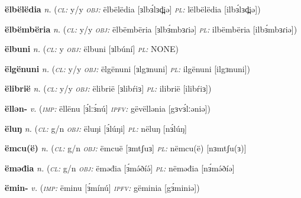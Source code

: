 \newentry
\headword\textbf{ëlbëlëdia}  
\synpos\textit{n.} 
\class(\textit{\textsc{cl:}} {y/y}
\object\textit{\textsc{obj:}} ëlbëlëdia [ɜlbɜ́lɜd̪iə]
\plural\textit{\textsc{pl:}} lëlbëlëdia [ilbɜ́lɜd̪iə])


\newentry
\headword\textbf{ëlbëmbëria}  
\synpos\textit{n.} 
\class(\textit{\textsc{cl:}} {y/y}
\object\textit{\textsc{obj:}} ëlbëmbëria [ɜlbɜ́mbɜɾiə]
\plural\textit{\textsc{pl:}} ilbëmbëria [ilbɜ́mbɜɾiə])

\newentry
\headword\textbf{ëlbuni}  
\ipa{[ɜlbúní]}
\synpos\textit{n.} 
\class(\textit{\textsc{cl:}} {y}
\object\textit{\textsc{obj:}} ëlbuni [ɜlbúní]
\plural\textit{\textsc{pl:}} NONE)

\newentry
\headword\textbf{ëlgënuni}  
\ipa{[ɜlgɜnuni]}
\synpos\textit{n.} 
\class(\textit{\textsc{cl:}} {y/y}
\object\textit{\textsc{obj:}} ëlgënuni [ɜlgɜnuni]
\plural\textit{\textsc{pl:}} ilgënuni [ilgɜnuni])

\newentry
\headword\textbf{ëlibrië}  
\ipa{[ɜlibŕiɜ]}
\synpos\textit{n.} 
\class(\textit{\textsc{cl:}} {y/y}
\object\textit{\textsc{obj:}} ëlibrië [ɜlibŕiɜ]
\plural\textit{\textsc{pl:}} ilibrië [ilibŕiɜ])


\newentry
\headword\textbf{ëllən-}  
\ipa{[ɜ́lːən-]}
\synpos\textit{v.} 
\imperative(\textit {\textsc{imp:}} ëllënu [ɜ́lːɜ́nú] 
\imperfective\textit{\textsc{ipfv:}} gëvëllənia [gɜvɜ́lːəniə])

\newentry
\headword\textbf{ëluŋ}  
\ipa{[ɜ́lúŋ]}
\synpos\textit{n.} 
\class(\textit{\textsc{cl:}} {g/n}
\object\textit{\textsc{obj:}} ëluŋi [ɜ́lúŋi]
\plural\textit{\textsc{pl:}} nëluŋ [nɜ́lúŋ]


\newentry
\headword\textbf{ëmcu(ë)}  
\ipa{[ɜmtʃu(ɜ)]}
\synpos\textit{n.} 
\class(\textit{\textsc{cl:}} {g/n}
\object\textit{\textsc{obj:}} ëmcuë [ɜmtʃuɜ]
\plural\textit{\textsc{pl:}} nëmcu(ë) [nɜmtʃu(ɜ)]

\newentry
\headword\textbf{ëməđia}  
\ipa{[ɜ́mə́ðíə]}
\synpos\textit{n.} 
\class(\textit{\textsc{cl:}} {g/n}
\object\textit{\textsc{obj:}} ëməđia [ɜ́mə́ðíə́]
\plural\textit{\textsc{pl:}} nëməđia [nɜ́mə́ðíə]


\newentry
\headword\textbf{ëmin-}  
\ipa{[ɜ́min-]}
\synpos\textit{v.} 
\imperative(\textit {\textsc{imp:}} ëminu [ɜ́mínú] 
\imperfective\textit{\textsc{ipfv:}} gëminia [gɜ́miniə])

